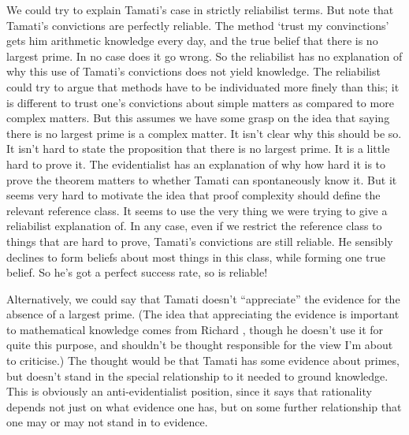 We could try to explain \gls{Tamati}'s case in strictly reliabilist terms. But note that \gls{Tamati}'s convictions are perfectly reliable. The method `trust my convinctions' gets him arithmetic knowledge every day, and the true belief that there is no largest prime. In no case does it go wrong. So the reliabilist has no explanation of why this use of \gls{Tamati}'s convictions does not yield knowledge. The reliabilist could try to argue that methods have to be individuated more finely than this; it is different to trust one's convictions about simple matters as compared to more complex matters. But this assumes we have some grasp on the idea that saying there is no largest prime is a complex matter. It isn't clear why this should be so. It isn't hard to state the proposition that there is no largest prime. It is a little hard to prove it. The evidentialist has an explanation of why how hard it is to prove the theorem matters to whether \gls{Tamati} can spontaneously know it. But it seems very hard to motivate the idea that proof complexity should define the relevant reference class. It seems to use the very thing we were trying to give a reliabilist explanation of. In any case, even if we restrict the reference class to things that are hard to prove, \gls{Tamati}'s convictions are still reliable. He sensibly declines to form beliefs about most things in this class, while forming one true belief. So he's got a perfect success rate, so is reliable!

Alternatively, we could say that \gls{Tamati} doesn't ``appreciate'' the evidence for the absence of a largest prime. (The idea that appreciating the evidence is important to mathematical knowledge comes from Richard \citet{Fumerton2010}, though he doesn't use it for quite this purpose, and shouldn't be thought responsible for the view I'm about to criticise.) The thought would be that \gls{Tamati} has some evidence about primes, but doesn't stand in the special relationship to it needed to ground knowledge. This is obviously an anti-evidentialist position, since it says that rationality depends not just on what evidence one has, but on some further relationship that one may or may not stand in to evidence.

